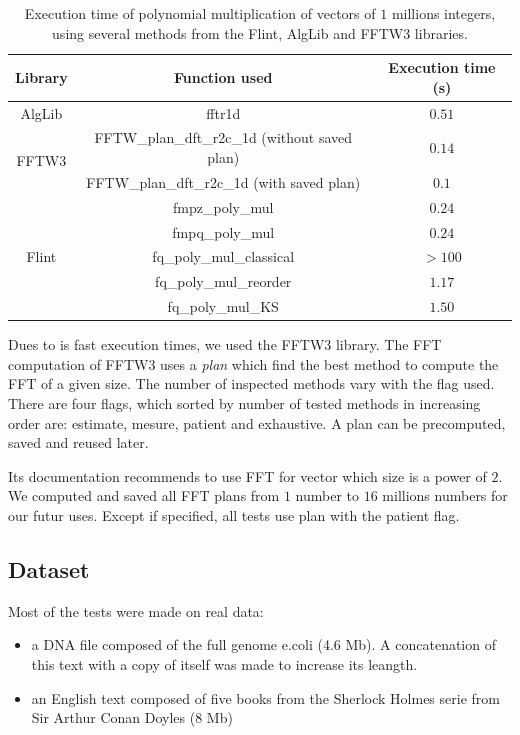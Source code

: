 \documentclass[preprint,12pt]{elsarticle}
\begin{document}
\begin{table}[h]
\label{tempsFFT}
\begin{tabular}{|c|c|c|}
\hline
Library 				& Function used 							& Execution time (s) \\ \hline
AlgLib 					& fftr1d 									& $0.51$ \\ \hline
\multirow{2}{*}{FFTW3} 	& FFTW\_plan\_dft\_r2c\_1d (without saved plan) & $0.14$ \\
						& FFTW\_plan\_dft\_r2c\_1d (with saved plan) 	& $0.1$ \\ \hline
\multirow{5}{*}{Flint} 	& fmpz\_poly\_mul 							& $0.24$ \\
						& fmpq\_poly\_mul 							& $0.24$ \\
						& fq\_poly\_mul\_classical 					& $> 100$ \\
						& fq\_poly\_mul\_reorder 						& $1.17$ \\
						& fq\_poly\_mul\_KS 							& $1.50$ \\ \hline
\end{tabular}
\caption{Execution time of polynomial multiplication of vectors of $1$ millions integers,
using several methods from the Flint, AlgLib and FFTW3 libraries.
}
\end{table}

Dues to is fast execution times, we used the FFTW3 library.
The FFT computation of FFTW3 uses a \textit{plan} which find the best method to compute the FFT of a given size.
The number of inspected methods vary with the flag used.
There are four flags, which sorted by number of tested methods in increasing order are:
estimate, mesure, patient and exhaustive.
A plan can be precomputed, saved and reused later.

Its documentation recommends to use FFT for vector which size is a power of $2$.
We computed and saved all FFT plans from $1$ number to $16$ millions numbers for our futur uses.
Except if specified, all tests use plan with the patient flag.


\subsection*{Dataset}

Most of the tests were made on real data:
\begin{itemize}
\setlength\itemsep{-0.4em}
\item a DNA file composed of the full genome e.coli (4.6 Mb). A concatenation of this text with a copy of itself was made to increase its leangth.
\item an English text composed of five books from the Sherlock Holmes serie from Sir Arthur Conan Doyles (8 Mb)
\end{itemize}
\end{document}
